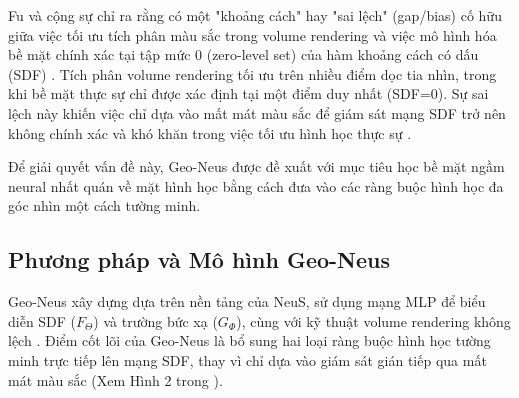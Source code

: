 Fu và cộng sự \cite{Fu2022GeoNeus} chỉ ra rằng có một "khoảng cách" hay "sai lệch" (gap/bias) cố hữu giữa việc tối ưu tích phân màu sắc trong volume rendering và việc mô hình hóa bề mặt chính xác tại tập mức 0 (zero-level set) của hàm khoảng cách có dấu (SDF) \cite{Fu2022GeoNeus_source_4, Fu2022GeoNeus_source_18, Fu2022GeoNeus_source_19, Fu2022GeoNeus_source_68, Fu2022GeoNeus_source_81, Fu2022GeoNeus_source_87}. Tích phân volume rendering tối ưu trên nhiều điểm dọc tia nhìn, trong khi bề mặt thực sự chỉ được xác định tại một điểm duy nhất (SDF=0). Sự sai lệch này khiến việc chỉ dựa vào mất mát màu sắc để giám sát mạng SDF trở nên không chính xác và khó khăn trong việc tối ưu hình học thực sự \cite{Fu2022GeoNeus_source_24, Fu2022GeoNeus_source_88}.

Để giải quyết vấn đề này, Geo-Neus \cite{Fu2022GeoNeus} được đề xuất với mục tiêu học bề mặt ngầm neural nhất quán về mặt hình học bằng cách đưa vào các ràng buộc hình học đa góc nhìn một cách tường minh.

\subsection{Phương pháp và Mô hình Geo-Neus}

Geo-Neus xây dựng dựa trên nền tảng của NeuS, sử dụng mạng MLP để biểu diễn SDF ($F_\Theta$) và trường bức xạ ($G_\Phi$), cùng với kỹ thuật volume rendering không lệch \cite{Fu2022GeoNeus_source_66, Fu2022GeoNeus_source_78}. Điểm cốt lõi của Geo-Neus là bổ sung hai loại ràng buộc hình học tường minh trực tiếp lên mạng SDF, thay vì chỉ dựa vào giám sát gián tiếp qua mất mát màu sắc \cite{Fu2022GeoNeus_source_3, Fu2022GeoNeus_source_29, Fu2022GeoNeus_source_37, Fu2022GeoNeus_source_90, Fu2022GeoNeus_source_91} (Xem Hình 2 trong \cite{Fu2022GeoNeus}).

